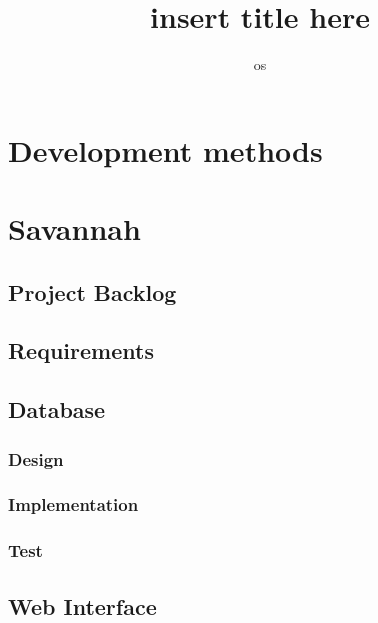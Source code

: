 

\title{insert title here} %
\author{os} %


\maketitle
\tableofcontents
	
	
		
\chapter{Development methods}
%	

\chapter{Savannah} %
    
  \section{Project Backlog}
    \label{sect:pback}
    

  \section{Requirements} %
  \section{Database}
  	
    \subsection{Design}
    	
    \subsection{Implementation}
    	
    \subsection{Test}

  \section{Web Interface}
   \label{sect:webInterface}

